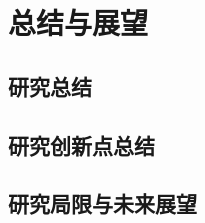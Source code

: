 \documentclass{xdupgthesis}
\begin{document}
\chapter{总结与展望}

\section{研究总结}



\section{研究创新点总结}



\section{研究局限与未来展望}
\end{document}
